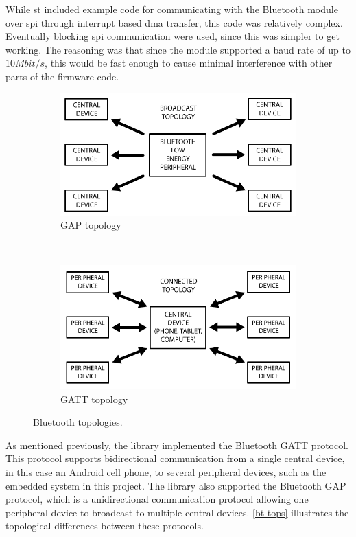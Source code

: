 While \gls{st} included example code for communicating with the Bluetooth module over \gls{spi} through interrupt based \gls{dma} transfer, this code was relatively complex. Eventually blocking \gls{spi} communication were used, since this was simpler to get working. The reasoning was that since the module supported a baud rate of up to $10 Mbit/s$, this would be fast enough to cause minimal interference with other parts of the firmware code.
\begin{figure}[H]
	\centering
	\begin{subfigure}[t]{0.47\textwidth}
	\includegraphics[width=\textwidth]{Figures/bt_gap.png}
	\caption{GAP topology}
	\label{bt-gap}
	\end{subfigure}
	~
	\begin{subfigure}[t]{0.47\textwidth}
	\includegraphics[width=\textwidth]{Figures/bt_gatt.png}
	\caption{ GATT topology}
	\label{bt-gatt}
	\end{subfigure}
	\caption{Bluetooth topologies.}\label{bt-tops}
\end{figure}

As mentioned previously, the library implemented the Bluetooth GATT protocol. This protocol supports bidirectional communication from a single central device, in this case an Android cell phone, to several peripheral devices, such as the embedded system in this project. The library also supported the Bluetooth GAP protocol, which is a unidirectional communication protocol allowing one peripheral device to broadcast to multiple central devices. \autoref{bt-tops} illustrates the topological differences between these protocols.

